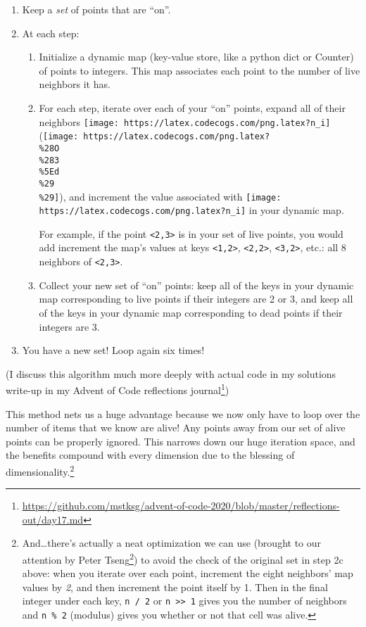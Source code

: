 \documentclass[]{article}
\renewcommand{\href}[2]{#2\footnote{\url{#1}}}
\begin{document}
\begin{enumerate}
\def\labelenumi{\arabic{enumi}.}
\tightlist
\item
  Keep a \emph{set} of points that are ``on''.
\item
  At each step:

  \begin{enumerate}
  \def\labelenumii{\alph{enumii}.}
  \item
    Initialize a dynamic map (key-value store, like a python dict or Counter) of
    points to integers. This map associates each point to the number of live
    neighbors it has.
  \item
    For each step, iterate over each of your ``on'' points, expand all of their
    neighbors \texttt{[image: https://latex.codecogs.com/png.latex?n\_i]}
    (\texttt{[image: https://latex.codecogs.com/png.latex?\\\%28O\\\%283\\\%5Ed\\\%29\\\%29]}),
    and increment the value associated with
    \texttt{[image: https://latex.codecogs.com/png.latex?n\_i]} in your dynamic
    map.

    For example, if the point \texttt{\textless{}2,3\textgreater{}} is in your
    set of live points, you would add increment the map's values at keys
    \texttt{\textless{}1,2\textgreater{}},
    \texttt{\textless{}2,2\textgreater{}},
    \texttt{\textless{}3,2\textgreater{}}, etc.: all 8 neighbors of
    \texttt{\textless{}2,3\textgreater{}}.
  \item
    Collect your new set of ``on'' points: keep all of the keys in your dynamic
    map corresponding to live points if their integers are 2 or 3, and keep all
    of the keys in your dynamic map corresponding to dead points if their
    integers are 3.
  \end{enumerate}
\item
  You have a new set! Loop again six times!
\end{enumerate}

(I discuss this algorithm much more deeply with actual code in
\href{https://github.com/mstksg/advent-of-code-2020/blob/master/reflections-out/day17.md}{my
solutions write-up in my Advent of Code reflections journal})

This method nets us a huge advantage because we now only have to loop over the
number of items that we know are alive! Any points away from our set of alive
points can be properly ignored. This narrows down our huge iteration space, and
the benefits compound with every dimension due to the blessing of
dimensionality.\footnote{And\ldots there's actually a neat optimization we can
  use (brought to our attention by
  \href{https://www.reddit.com/r/adventofcode/comments/kfb6zx/day_17_getting_to_t6_at_for_higher_spoilerss/ghmllf8}{Peter
  Tseng}) to avoid the check of the original set in step 2c above: when you
  iterate over each point, increment the eight neighbors' map values by
  \emph{2}, and then increment the point itself by 1. Then in the final integer
  under each key, \texttt{n\ /\ 2} or
  \texttt{n\ \textgreater{}\textgreater{}\ 1} gives you the number of neighbors
  and \texttt{n\ \%\ 2} (modulus) gives you whether or not that cell was alive.}
\end{document}

